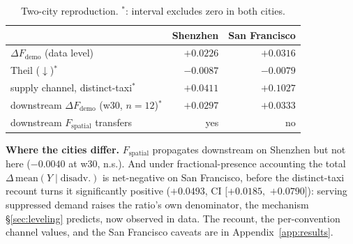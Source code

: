 \begin{table}[!ht]
\centering
\caption{Two-city reproduction. $^{*}$: interval excludes zero in both cities.}
\label{tab:twocity}
\footnotesize
\setlength{\tabcolsep}{4pt}
\begin{tabular}{lrr}
\toprule
 & Shenzhen & San Francisco \\
\midrule
$\Delta F_{\mathrm{demo}}$ (data level) & $+0.0226$ & $+0.0316$ \\
Theil ($\downarrow$)$^{*}$ & $-0.0087$ & $-0.0079$ \\
supply channel, distinct-taxi$^{*}$ & $+0.0411$ & $+0.1027$ \\
downstream $\Delta F_{\mathrm{demo}}$ (w30, $n{=}12$)$^{*}$ & $+0.0297$ & $+0.0333$ \\
downstream $F_{\mathrm{spatial}}$ transfers & yes & no \\
\bottomrule
\end{tabular}
\end{table}

\textbf{Where the cities differ.} $F_{\mathrm{spatial}}$ propagates downstream on
Shenzhen but not here ($-0.0040$ at w30, n.s.). And under fractional-presence
accounting the total $\Delta\,\mathrm{mean}(Y \mid \mathrm{disadv.})$ is
net-negative on San Francisco, before the distinct-taxi recount turns it
significantly positive ($+0.0493$, CI $[+0.0185,$ $+0.0790]$): serving
suppressed demand raises the ratio's own denominator, the mechanism
\S\ref{sec:leveling} predicts, now observed in data. The recount, the
per-convention channel values, and the San Francisco caveats are in
Appendix~\ref{app:results}.

